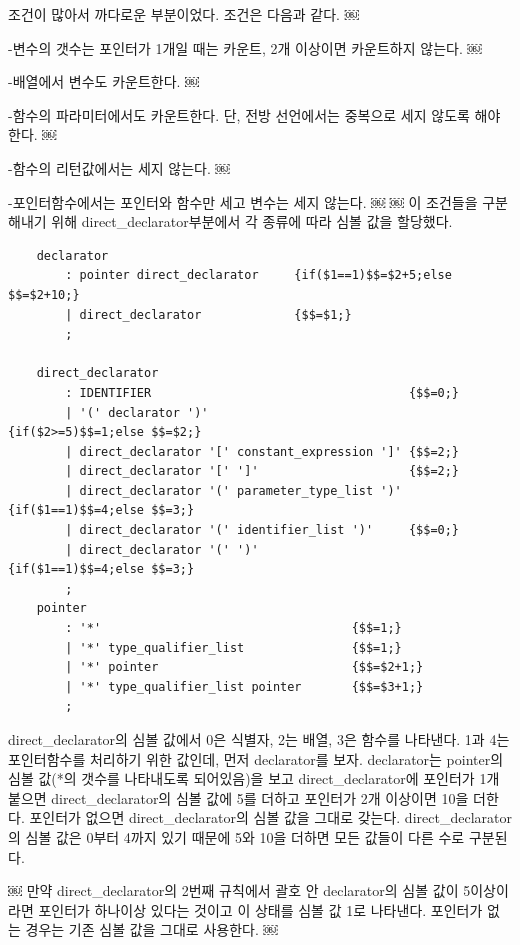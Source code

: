 \documentclass{oblivoir}
\begin{document}
조건이 많아서 까다로운 부분이었다. 조건은 다음과 같다.
￼

-변수의 갯수는 포인터가 1개일 때는 카운트, 2개 이상이면 카운트하지 않는다.
￼

-배열에서 변수도 카운트한다.
￼

-함수의 파라미터에서도 카운트한다. 단, 전방 선언에서는 중복으로 세지 않도록 해야 한다.
￼

-함수의 리턴값에서는 세지 않는다.
￼

-포인터함수에서는 포인터와 함수만 세고 변수는 세지 않는다. \newline \newline
￼
￼
이 조건들을 구분해내기 위해 direct\_declarator부분에서 각 종류에 따라 심볼 값을 할당했다.
\begin{verbatim}
    declarator
        : pointer direct_declarator     {if($1==1)$$=$2+5;else $$=$2+10;}
        | direct_declarator             {$$=$1;}
        ;
    
    direct_declarator
        : IDENTIFIER                                    {$$=0;}
        | '(' declarator ')'                            {if($2>=5)$$=1;else $$=$2;}
        | direct_declarator '[' constant_expression ']' {$$=2;}
        | direct_declarator '[' ']'                     {$$=2;}
        | direct_declarator '(' parameter_type_list ')' {if($1==1)$$=4;else $$=3;}        
        | direct_declarator '(' identifier_list ')'     {$$=0;}
        | direct_declarator '(' ')'                     {if($1==1)$$=4;else $$=3;}
        ;
    pointer
        : '*'                                   {$$=1;}
        | '*' type_qualifier_list               {$$=1;}
        | '*' pointer                           {$$=$2+1;}
        | '*' type_qualifier_list pointer       {$$=$3+1;}
        ;
\end{verbatim}
direct\_declarator의 심볼 값에서
0은 식별자, 2는 배열, 3은 함수를 나타낸다.
1과 4는 포인터함수를 처리하기 위한 값인데,
먼저 declarator를 보자. 
declarator는 pointer의 심볼 값(*의 갯수를 나타내도록 되어있음)을 보고
direct\_declarator에 포인터가 1개 붙으면 direct\_declarator의 심볼 값에 5를 더하고 포인터가 2개 이상이면 10을 더한다. 
포인터가 없으면 direct\_declarator의 심볼 값을 그대로 갖는다.
direct\_declarator의 심볼 값은 0부터 4까지 있기 때문에 5와 10을 더하면 모든 값들이 다른 수로 구분된다.

￼
만약 direct\_declarator의 2번째 규칙에서 괄호 안 declarator의 심볼 값이 5이상이라면 포인터가 하나이상 있다는 것이고 이 상태를 심볼 값 1로 나타낸다. 포인터가 없는 경우는 기존 심볼 값을 그대로 사용한다. 
￼
\end{document}
